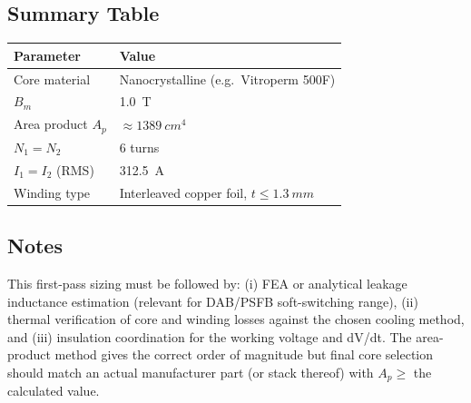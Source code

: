 \documentclass[11pt,a4paper]{article}
\begin{document}
\subsection*{Summary Table}
\begin{center}
\begin{tabular}{@{}ll@{}}
\toprule
Parameter & Value \\
\midrule
Core material & Nanocrystalline (e.g.\ Vitroperm 500F) \\
$B_m$ & \SI{1.0}{T} \\
Area product $A_p$ & $\approx \SI{1389}{cm^4}$ \\
$N_1 = N_2$ & 6 turns \\
$I_1 = I_2$ (RMS) & \SI{312.5}{A} \\
Winding type & Interleaved copper foil, $t \le \SI{1.3}{mm}$ \\
\bottomrule
\end{tabular}
\end{center}

\subsection*{Notes}
This first-pass sizing must be followed by: (i) FEA or analytical leakage
inductance estimation (relevant for DAB/PSFB soft-switching range), (ii) thermal
verification of core and winding losses against the chosen cooling method, and
(iii) insulation coordination for the working voltage and dV/dt. The area-product
method gives the correct order of magnitude but final core selection should match
an actual manufacturer part (or stack thereof) with $A_p \ge$ the calculated value.
\end{document}
